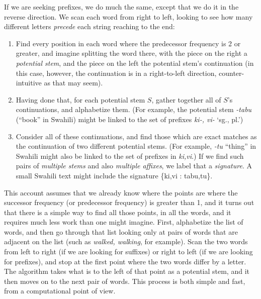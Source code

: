 \documentclass[output=paper,colorlinks,citecolor=brown,
]{langscibook}
\begin{document}
If we are seeking prefixes, we do much the same, except that we do it in the reverse direction. We scan each word from right to left, looking to see how many different letters \textit{precede} each string reaching to the end:

\begin{enumerate}
\item  Find every position in each word where the predecessor frequency is 2 or greater, and imagine splitting the word there, with the piece on the right a \textit{potential stem}, and the piece on the left the potential stem's continuation (in this case, however, the continuation is in a right-to-left direction, counter-intuitive as that may seem).

\item  Having done that, for each potential stem $S$, gather together all of $S$'s continuations, and alphabetize them. (For example, the potential stem \textit{-tabu} (``book'' in Swahili) might be linked to the set of prefixes \textit{ki-, vi-} `sg., pl.') 

\item  Consider all of these continuations, and find those which are exact matches as the continuation of two different potential stems. (For example, \textit{-tu} ``thing'' in Swahili might also be linked to the set of prefixes in \textit{ki,vi}.) If we find such pairs of \textit{multiple stems} and also \textit{multiple affixes}, we label that a \textit{signature}.  A small Swahili text might include the signature \{ki,vi : tabu,tu\}.
\end{enumerate}

 


This account assumes that we already know where the points are where the successor frequency (or predecessor frequency) is greater than 1, and it turns out that there is a simple way to find all those points, in all the words, and it requires much less work than one might imagine. First, alphabetize the list of words, and then go through that list looking only at pairs of words that are adjacent on the list (such as \textit{walked, walking}, for example). Scan the two words from left to right (if we are looking for suffixes) or right to left (if we are looking for prefixes), and stop at the first point where the two words differ by a letter. The algorithm takes what is to the left of that point as a potential stem, and it then moves on to the next pair of words. This process is both simple and fast, from a computational point of view.
\end{document}
